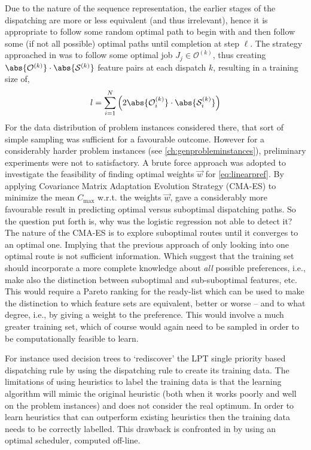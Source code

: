 Due to the nature of the sequence representation, the earlier stages of the dispatching are more or less equivalent (and thus irrelevant), hence it is appropriate to follow some random optimal path to begin with and then follow some (if not all possible) optimal paths until completion at step $\ell$. The strategy approached in  \cite{InRu11a} was to follow some optimal job $J_j\in\mathcal{O}^{(k)}$, thus creating $\abs{\mathcal{O}^{(k)}}\cdot\abs{\mathcal{S}^{(k)}}$ feature pairs at each dispatch $k$, resulting in a training size of,
\begin{equation}\label{eq:sizeS_b}
l =  \sum_{i=1}^N \left(2 \abs{\mathcal{O}^{(k)}_i}\cdot \abs{\mathcal{S}^{(k)}_i} \right)
\end{equation}
For the data distribution of problem instances considered there, that sort of simple sampling was sufficient for a favourable outcome. However for a considerably harder problem instances (see \cref{ch:genprobleminstances}), preliminary experiments were not to satisfactory. 
A brute force approach was adopted to investigate the feasibility of finding optimal weights $\vec{w}$ for \cref{eq:linearpref}. By applying Covariance Matrix Adaptation Evolution Strategy (CMA-ES) \citep{Hansen01} to minimize the mean $C_{\max}$  w.r.t. the weights $\vec{w}$, gave a considerably more favourable result in predicting optimal versus suboptimal dispatching paths. So the question put forth is, why was the logistic regression not able to detect it?
The nature of the CMA-ES is to explore suboptimal routes until it converges to an optimal one. Implying that the previous approach of only looking into one optimal route is not sufficient information. Which suggest that the training set should incorporate a more complete knowledge about \emph{all} possible preferences, i.e., make also the distinction between suboptimal and sub-suboptimal features, etc.  This would require a Pareto ranking for the ready-list which can be used to make the distinction to which feature sets are equivalent, better or worse -- and to what degree, i.e., by giving a weight to the preference. This would involve a much greater training set, which of course would again need to be sampled in order to be computationally feasible to learn. 

For instance \cite{Siggi05} used decision trees to `rediscover' the LPT single priority based dispatching rule by using the dispatching rule to create its training data. The limitations of using heuristics to label the training data is that the learning algorithm will mimic the original heuristic (both when it works poorly and well on the problem instances) and does not consider the real optimum. In order to learn heuristics that can outperform existing heuristics then the training data needs to be correctly labelled. This drawback is confronted in \citep{Malik08,Russell09,Siggi10} by using an optimal scheduler, computed off-line. 

